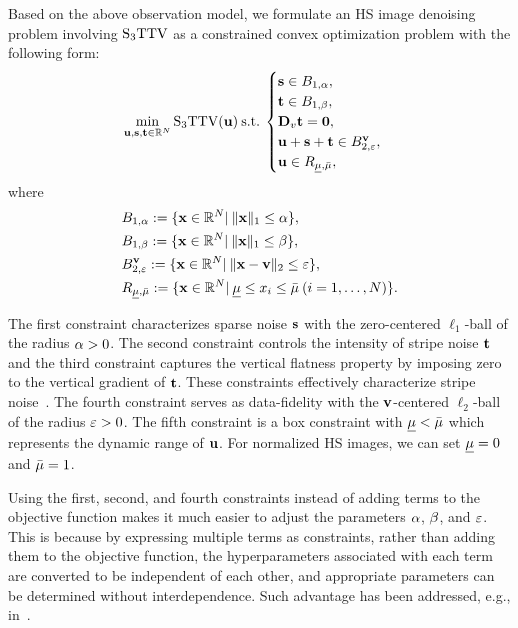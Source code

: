 Based on the above observation model, we formulate an HS image denoising problem involving ${\text{S}_{3} \text{TTV}}$ as a constrained convex optimization problem with the following form:
\begin{equation}
	\label{prob:S3TTV_denoising}
	\min_{\mathbf{u}, \mathbf{s}, \mathbf{t} \in \mathbb{R}^{N}} {\text{S}_{3} \text{TTV}}(\mathbf{u}) \: \mathrm{s.t.} \:
	\begin{cases} 
		\mathbf{s} \in B_{1, \alpha}, \\ 
		\mathbf{t} \in B_{1, \beta}, \\
		\mathbf{D}_{v} \mathbf{t} = \mathbf{0}, \\
		\mathbf{u} + \mathbf{s} + \mathbf{t} \in B_{2, \varepsilon}^{\mathbf{v}}, \\  
		\mathbf{u} \in R_{\underline{\mu},\bar{\mu}},
	\end{cases}
\end{equation}
where
\begin{align}
	\label{eq:constraint_sparse}
	&B_{1, \alpha} := \{ \mathbf{x} \in \mathbb{R}^{N} | \:
	\|\mathbf{x}\|_{1} \leq \alpha \},  \\
	\label{eq:constraint_stripe}
	&B_{1, \beta} := \{ \mathbf{x} \in \mathbb{R}^{N} | \:
	\|\mathbf{x}\|_{1} \leq \beta \},  \\
	\label{eq:constraint_fidel}
	&B_{2, \varepsilon}^{\mathbf{v}} := \{ \mathbf{x} \in \mathbb{R}^{N} | \:
	\|\mathbf{x} - \mathbf{v}\|_2 \leq \varepsilon \},  \\
	\label{eq:constraint_box}
	&R_{\underline{\mu},\bar{\mu}} := \{ \mathbf{x} \in \mathbb{R}^{N} | \:
	\underline{\mu} \leq x_{i} \leq \bar{\mu}  \: (i = 1, \dots , N) \}.
\end{align}

The first constraint characterizes sparse noise $\mathbf{s}$ with the zero-centered $\ell_1$-ball of the radius $\alpha > 0$. The second constraint controls the intensity of stripe noise $\mathbf{t}$ and the third constraint captures the vertical flatness property by imposing zero to the vertical gradient of $\mathbf{t}$. These constraints effectively characterize stripe noise~\cite{Naganuma2022Destriping}. The fourth constraint serves as data-fidelity with the $\mathbf{v}$-centered $\ell_2$-ball of the radius $\varepsilon > 0$. The fifth constraint is a box constraint with $\underline{\mu} < \bar{\mu}$ which represents the dynamic range of $\mathbf{u}$. For normalized HS images, we can set $\underline{\mu} = 0$ and $\bar{\mu} = 1$.


Using the first, second, and fourth constraints instead of adding terms to the objective function makes it much easier to adjust the parameters $\alpha$, $\beta$, and $\varepsilon$. This is because by expressing multiple terms as constraints, rather than adding them to the objective function, the hyperparameters associated with each term are converted to be independent of each other, and appropriate parameters can be determined without interdependence. Such advantage has been addressed, e.g., in~\cite{Afonso2011Constraint, Chierchia2015Constraint, Ono2015Constraint, Ono2017Constraint, Ono2019Constraint}.


